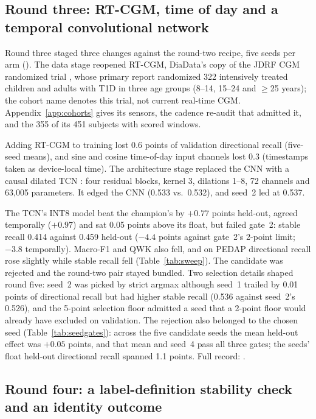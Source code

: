 \documentclass[10pt,twocolumn]{article}
\begin{document}
\subsection{Round three: RT-CGM, time of day and a temporal convolutional
network}

Round three staged three changes against the round-two recipe, five
seeds per arm (). The data stage reopened
RT-CGM, DiaData's copy of the JDRF CGM randomized trial
\cite{jdrf2008cgm}, whose primary report randomized 322 intensively
treated children and adults with T1D in three age groups (8--14, 15--24
and $\geq$25 years); the cohort name denotes this trial, not current
real-time CGM. Appendix~\ref{app:cohorts} gives its sensors, the cadence
re-audit that admitted it, and the 355 of its 451 subjects with scored
windows.

Adding RT-CGM to training lost 0.6 points of validation directional
recall (five-seed means), and sine and cosine time-of-day input channels
lost 0.3 (timestamps taken as device-local time). The architecture stage
replaced the CNN with a causal dilated TCN \cite{bai2018tcn}: four
residual blocks, kernel 3, dilations 1--8, 72 channels and 63,005
parameters. It edged the CNN (0.533 vs.\ 0.532), and seed~2 led at 0.537.

The TCN's INT8 model beat the champion's by $+0.77$ points held-out,
agreed temporally ($+0.97$) and sat 0.05 points above its float, but
failed gate~2: stable recall 0.414 against 0.459 held-out ($-4.4$ points
against gate~2's 2-point limit; $-3.8$ temporally). Macro-F1 and QWK also
fell, and on PEDAP directional recall rose slightly while stable recall
fell (Table~\ref{tab:sweep}). The candidate was rejected and the round-two
pair stayed bundled. Two selection details shaped round five: seed~2 was
picked by strict argmax although seed~1 trailed by 0.01 points of
directional recall but had higher stable recall (0.536 against seed~2's
0.526), and the 5-point selection floor admitted a seed that a 2-point
floor would already have excluded on validation. The rejection also
belonged to the chosen seed (Table~\ref{tab:seedgates}): across the five
candidate seeds the mean held-out effect was $+0.05$ points, and that mean
and seed~4 pass all three gates; the seeds' float held-out directional
recall spanned 1.1 points. Full record: .

\subsection{Round four: a label-definition stability check and an
identity outcome}
\end{document}
